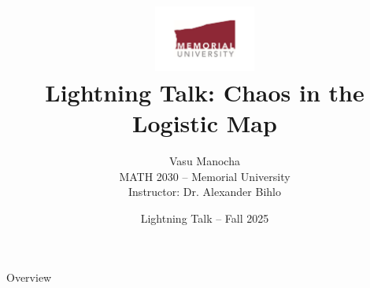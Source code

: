 \documentclass{beamer}
\title{
  \includegraphics[width=0.25\textwidth]{../logo/mun_logo.pdf}\\[1em]
  Lightning Talk: Chaos in the Logistic Map
}
\author{Vasu Manocha \\
MATH 2030 – Memorial University \\
Instructor: Dr. Alexander Bihlo}
\date{Lightning Talk – Fall 2025}
\begin{document}
\begin{frame}
  \titlepage
\end{frame}

\begin{frame}{Overview}
\end{frame}
\end{document}
